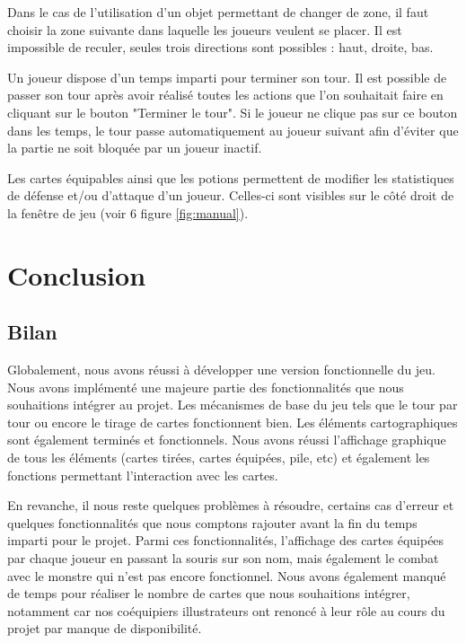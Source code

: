 \documentclass[12pt]{report}
\begin{document}
    Dans le cas de l'utilisation d'un objet permettant de changer de zone, il faut choisir la zone suivante dans laquelle les joueurs veulent se placer. Il est impossible de reculer, seules trois directions sont possibles : haut, droite, bas.

    Un joueur dispose d'un temps imparti pour terminer son tour. Il est possible de passer son tour après avoir réalisé toutes les actions que l'on souhaitait faire en cliquant sur le bouton "Terminer le tour". Si le joueur ne clique pas sur ce bouton dans les temps, le tour passe automatiquement au joueur suivant afin d'éviter que la partie ne soit bloquée par un joueur inactif.

    Les cartes équipables ainsi que les potions permettent de modifier les statistiques de défense et/ou d'attaque d'un joueur. Celles-ci sont visibles sur le côté droit de la fenêtre de jeu (voir 6 figure \ref{fig:manual}).

\chapter*{Conclusion}

    \section*{Bilan}

    Globalement, nous avons réussi à développer une version fonctionnelle du jeu. Nous avons implémenté une majeure partie des fonctionnalités que nous souhaitions intégrer au projet. Les mécanismes de base du jeu tels que le tour par tour ou encore le tirage de cartes fonctionnent bien. Les éléments cartographiques sont également terminés et fonctionnels. Nous avons réussi l'affichage graphique de tous les éléments (cartes tirées, cartes équipées, pile, etc) et également les fonctions permettant l'interaction avec les cartes.

    En revanche, il nous reste quelques problèmes à résoudre, certains cas d'erreur et quelques fonctionnalités que nous comptons rajouter avant la fin du temps imparti pour le projet. Parmi ces fonctionnalités, l'affichage des cartes équipées par chaque joueur en passant la souris sur son nom, mais également le combat avec le monstre qui n'est pas encore fonctionnel. Nous avons également manqué de temps pour réaliser le nombre de cartes que nous souhaitions intégrer, notamment car nos coéquipiers illustrateurs ont renoncé à leur rôle au cours du projet par manque de disponibilité.
\end{document}
